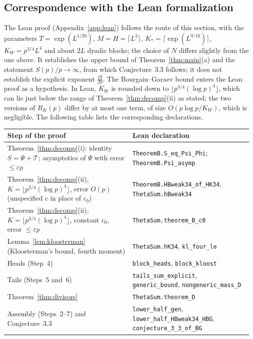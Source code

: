 \subsection{Correspondence with the Lean formalization}

The Lean proof (Appendix~\ref{app:lean}) follows the route of this section, with the parameters $T=\exp(L^{1/20})$, $M=H=\lceil L^2\rceil$, $K_*=\lceil\exp(L^{9/10})\rceil$, $K_W=p^{3/4}L^4$ and about $2L$ dyadic blocks; the choice of $N$ differs slightly from the one above. It establishes the upper bound of Theorem~\ref{thm:main}(a) and the statement $S(p)/p\to\infty$, from which Conjecture~3.3 follows; it does not establish the explicit exponent $\frac{19}{20}$. The Bourgain--Garaev bound enters the Lean proof as a hypothesis. In Lean, $K_W$ is rounded down to $\lfloor p^{3/4}(\log p)^4\rfloor$, which can lie just below the range of Theorem~\ref{thm:decomp}(ii) as stated; the two versions of $R_{K}(p)$ differ by at most one term, of size $O(p\log p/K_W)$, which is negligible. The following table lists the corresponding declarations.

\begin{center}
\small
\renewcommand{\arraystretch}{1.2}
\begin{tabular}{@{}p{5.3cm}p{8.4cm}@{}}
\toprule
Step of the proof & Lean declaration\\
\midrule
Theorem~\ref{thm:decomp}(i): identity $S=\Psi+\mathcal T$; asymptotics of $\Psi$ with error $\le\varepsilon p$ & \raggedright\texttt{TheoremB.S\_eq\_Psi\_Phi}; \texttt{TheoremB.Psi\_asymp}\tabularnewline
Theorem~\ref{thm:decomp}(ii), $K=\lfloor p^{3/4}(\log p)^4\rfloor$, error $O(p)$ (unspecified $c$ in place of $c_0$) & \raggedright\texttt{TheoremB.HBweak34\_of\_HK34}, \texttt{ThetaSum.hBweak34}\tabularnewline
Theorem~\ref{thm:decomp}(ii), $K=\lfloor p^{3/4}(\log p)^4\rfloor$, constant $c_0$, error $\le\varepsilon p$ & \raggedright\texttt{ThetaSum.theorem\_B\_c0}\tabularnewline
Lemma~\ref{lem:kloosterman} (Kloosterman's bound, fourth moment) & \raggedright\texttt{ThetaSum.hK34}, \texttt{kl\_four\_le}\tabularnewline
Heads (Step~4) & \raggedright\texttt{block\_heads}, \texttt{block\_kloost}\tabularnewline
Tails (Steps~5 and~6) & \raggedright\texttt{tails\_sum\_explicit}, \texttt{generic\_bound}, \texttt{nongeneric\_mass\_D}\tabularnewline
Theorem~\ref{thm:divisors} & \raggedright\texttt{ThetaSum.theorem\_D}\tabularnewline
Assembly (Steps~2--7) and Conjecture~3.3 & \raggedright\texttt{lower\_half\_gen}, \texttt{lower\_half\_HBweak34\_HBG}, \texttt{conjecture\_3\_3\_of\_BG}\tabularnewline
\bottomrule
\end{tabular}
\end{center}
